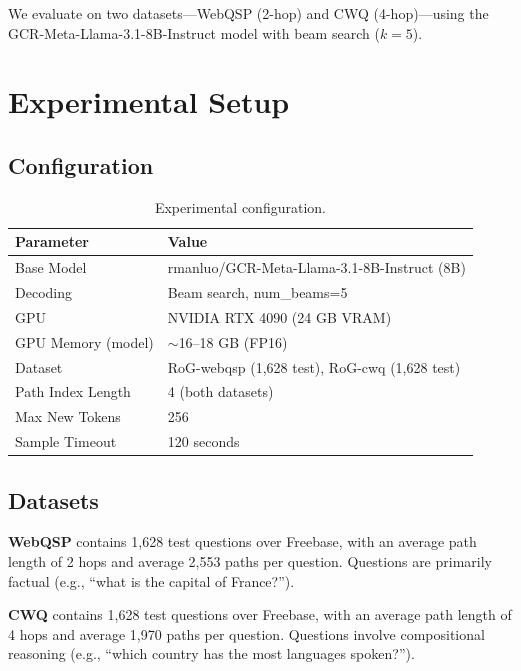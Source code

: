 \documentclass[11pt,twoside]{article}
\begin{document}
We evaluate on two datasets---WebQSP (2-hop) and CWQ (4-hop)---using the
GCR-Meta-Llama-3.1-8B-Instruct model with beam search (\(k=5\)).

\section{Experimental Setup}
\label{sec:setup}

\subsection{Configuration}

\begin{table}[H]
  \centering
  \caption{Experimental configuration.}
  \label{tab:config}
  \begin{tabular}{ll}
    \toprule
    \textbf{Parameter} & \textbf{Value} \\
    \midrule
    Base Model & rmanluo/GCR-Meta-Llama-3.1-8B-Instruct (8B) \\
    Decoding & Beam search, num\_beams=5 \\
    GPU & NVIDIA RTX 4090 (24 GB VRAM) \\
    GPU Memory (model) & \(\sim\)16--18 GB (FP16) \\
    Dataset & RoG-webqsp (1,628 test), RoG-cwq (1,628 test) \\
    Path Index Length & 4 (both datasets) \\
    Max New Tokens & 256 \\
    Sample Timeout & 120 seconds \\
    \bottomrule
  \end{tabular}
\end{table}

\subsection{Datasets}

\textbf{WebQSP} contains 1,628 test questions over Freebase, with an average
path length of 2 hops and average 2,553 paths per question. Questions are
primarily factual (e.g., ``what is the capital of France?'').

\textbf{CWQ} contains 1,628 test questions over Freebase, with an average path
length of 4 hops and average 1,970 paths per question. Questions involve
compositional reasoning (e.g., ``which country has the most languages
spoken?'').
\end{document}
